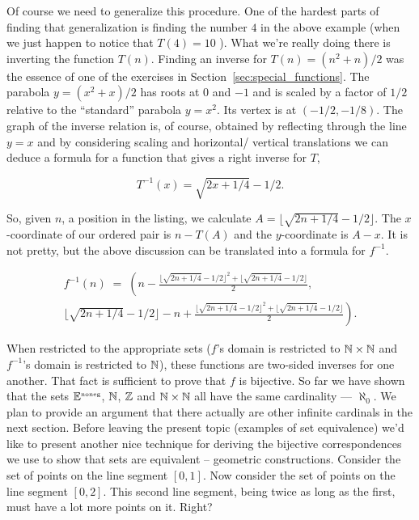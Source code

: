 Of course we need to generalize this procedure.  One of the hardest parts
of finding that generalization is finding the number $4$ in the above example
(when we just happen to notice that $T(4)=10$ ).  What we're really doing
there is inverting the function $T(n)$.  Finding an inverse for 
$T(n) = (n^2+n)/2$ was the essence of one of the exercises in 
Section~\ref{sec:special_functions}.  
The parabola $y = (x^2 + x)/2$ has roots at $0$ and $-1$ and is scaled by a
factor of $1/2$ relative to the ``standard'' parabola $y = x^2$.  
Its vertex is at
$(-1/2,-1/8)$.  The graph of the inverse relation is, of course, obtained by
reflecting through the line $y = x$ and by considering scaling and horizontal/
vertical translations we can deduce a formula for a function that gives a
right inverse for $T$, 

\[ T^{-1}(x) = \sqrt{2x + 1/4} - 1/2. \]

So, given $n$, a position in the listing, we calculate $A = \lfloor \sqrt{2n + 1/4}-1/2 \rfloor$.  The $x$-coordinate of our ordered pair is $n-T(A)$ 
and the $y$-coordinate is $A-x$.  
It is not pretty, but the above discussion can be translated into a formula
for $f^{-1}$.

\begin{gather*}
f^{-1}(n) \; = \; \left( n - \frac{ \lfloor \sqrt{2n + 1/4} - 1/2 \rfloor^2 + \lfloor \sqrt{2n + 1/4} - 1/2 \rfloor}{2} , \right. \\
\left. \lfloor \sqrt{2n + 1/4} - 1/2  \rfloor - n + \frac{\lfloor \sqrt{2n + 1/4} - 1/2 \rfloor^2 + \lfloor \sqrt{2n + 1/4} - 1/2 \rfloor}{2} \right).
\end{gather*}

When restricted to the appropriate sets ($f$'s domain 
is restricted to ${\mathbb N} \times {\mathbb N}$
and $f^{-1}$'s domain is restricted to ${\mathbb N}$), 
these functions are two-sided inverses
for one another. That fact is sufficient to prove that $f$ 
is bijective.  
So far we have shown that the sets ${\mathbb E}^{\mbox{\tiny noneg}}$, ${\mathbb N}$, ${\mathbb Z}$ and 
${\mathbb N} \times {\mathbb N}$ all have
the same cardinality ---  $\aleph_0$.  We plan to provide an argument that there
actually are other infinite cardinals in the next section. Before leaving the
present topic (examples of set equivalence) we'd like to present another nice
technique for deriving the bijective correspondences we use to show that sets
are equivalent -- geometric constructions.
Consider the set of points on the line segment $[0, 1]$. 
Now consider the set
of points on the line segment $[0, 2]$. This second line 
segment, being twice as
long as the first, must have a lot more points on it. Right?

